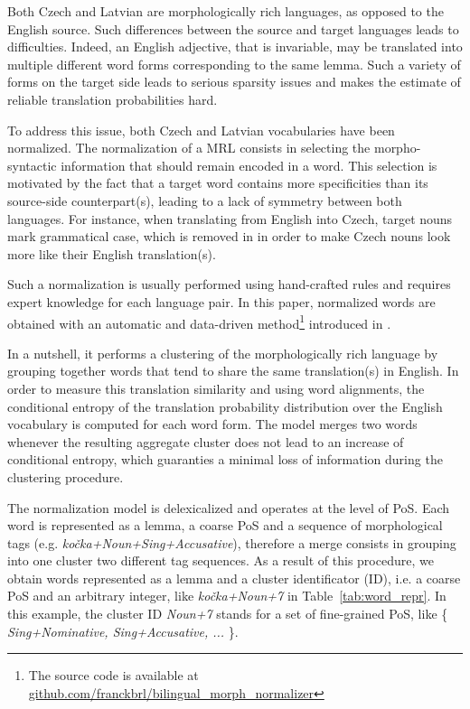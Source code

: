 \documentclass[11pt,letterpaper,final]{article}
\begin{document}
Both Czech and Latvian are morphologically rich languages,
as opposed to the English source. Such differences
between the source and target languages leads to difficulties.
Indeed, an English adjective, that is invariable, may be translated into multiple different word forms corresponding
to the same lemma. Such a variety of forms on the target
side leads to serious sparsity issues and makes the estimate
of reliable translation probabilities hard.

To address this issue, both Czech and Latvian vocabularies have been
normalized. The normalization of a MRL consists in
selecting the morpho-syntactic information that should
remain encoded in a word. This selection is motivated by
the fact that a target word contains more specificities
than its source-side counterpart(s), leading to a lack of
symmetry between both languages. For instance, when
translating from English into Czech, target nouns mark
grammatical case, which is removed in \cite{Burlot16reinflection}
in order to make Czech nouns look more like their English
translation(s).

Such a normalization is usually performed using hand-crafted
rules and requires expert knowledge for each language pair.
In this paper, normalized words are obtained with an
automatic and data-driven method\footnote{The source code is available at \url{github.com/franckbrl/bilingual_morph_normalizer}}
introduced in \cite{burlot17normal}.

In a nutshell, it performs a clustering of the morphologically
rich language by grouping together words that tend to
share the same translation(s) in English. In order to measure
this translation similarity and using word alignments, the
conditional entropy of the translation probability distribution
over the English vocabulary is computed for
each word form. The model merges two words whenever the resulting
aggregate cluster does not lead to an increase of conditional
entropy, which guaranties a minimal loss of information
during the clustering procedure.

The normalization model is delexicalized and operates at
the level of PoS. Each word is represented as a lemma,
a coarse PoS and a sequence of morphological tags (e.g.
{\it ko\v{c}ka+Noun+Sing+Accusative}), therefore
a merge consists in grouping into one cluster two different
tag sequences. As a result of this procedure, we obtain
words represented as a lemma and a cluster identificator (ID),
i.e. a coarse PoS and an arbitrary integer, like {\it ko\v{c}ka+Noun+7}
in Table~\ref{tab:word_repr}. In this example, the cluster
ID {\it Noun+7} stands for a set of fine-grained
PoS, like \{ {\it Sing+Nominative, Sing+Accusative, ...} \}.
\end{document}
